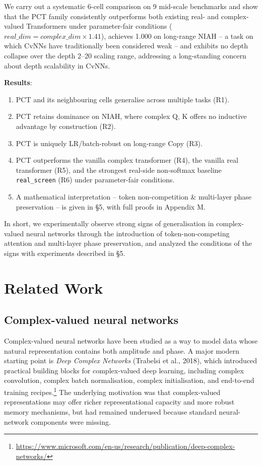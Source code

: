 \documentclass[11pt,a4paper]{article}
\theoremstyle{plain}
\theoremstyle{definition}
\begin{document}
We carry out a systematic 6-cell comparison on 9 mid-scale benchmarks and show that the PCT family consistently outperforms both existing real- and complex-valued Transformers under parameter-fair conditions ($real\_dim = complex\_dim \times 1.41$), achieves 1.000 on long-range NIAH -- a task on which CvNNs have traditionally been considered weak -- and exhibits no depth collapse over the depth 2--20 scaling range, addressing a long-standing concern about depth scalability in CvNNs.

\textbf{Results}:

\begin{enumerate}
  \item PCT and its neighbouring cells generalise across multiple tasks (R1).
  \item PCT retains dominance on NIAH, where complex Q, K offers no inductive advantage by construction (R2).
  \item PCT is uniquely LR/batch-robust on long-range Copy (R3).
  \item PCT outperforms the vanilla complex transformer (R4), the vanilla real transformer (R5), and the strongest real-side non-softmax baseline \texttt{real\_screen} (R6) under parameter-fair conditions.
  \item A mathematical interpretation -- token non-competition \& multi-layer phase preservation -- is given in \S{}5, with full proofs in Appendix M.
\end{enumerate}

In short, we experimentally observe strong signs of generalisation in complex-valued neural networks through the introduction of token-non-competing attention and multi-layer phase preservation, and analyzed the conditions of the signs with experiments described in \S{}5.

\medskip

\section{Related Work}
\subsection{Complex-valued neural networks}
Complex-valued neural networks have been studied as a way to model data whose natural representation contains both amplitude and phase. A major modern starting point is \emph{Deep Complex Networks} (Trabelsi et al., 2018), which introduced practical building blocks for complex-valued deep learning, including complex convolution, complex batch normalisation, complex initialisation, and end-to-end training recipes.\footnote{\url{https://www.microsoft.com/en-us/research/publication/deep-complex-networks/}} The underlying motivation was that complex-valued representations may offer richer representational capacity and more robust memory mechanisms, but had remained underused because standard neural-network components were missing.
\end{document}
